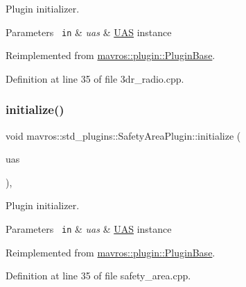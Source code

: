 Plugin initializer. 


\begin{DoxyParams}[1]{Parameters}
\mbox{\texttt{ in}}  & {\em uas} & {\ttfamily \mbox{\hyperlink{classmavros_1_1UAS}{U\+AS}}} instance \\
\hline
\end{DoxyParams}


Reimplemented from \mbox{\hyperlink{group__plugin_gad5313a41da4d26acbbabf008cdc21e82}{mavros\+::plugin\+::\+Plugin\+Base}}.



Definition at line 35 of file 3dr\+\_\+radio.\+cpp.

\mbox{\label{group__plugin_gae1ffa70f4b88baa719fdcc22b7b739b6}} 
\subsubsection{\texorpdfstring{initialize()}{initialize()}\hspace{0.1cm}{\footnotesize\ttfamily [7/41]}}
{\footnotesize\ttfamily void mavros\+::std\+\_\+plugins\+::\+Safety\+Area\+Plugin\+::initialize (\begin{DoxyParamCaption}\item[{\mbox{\hyperlink{classmavros_1_1UAS}{U\+AS}} \&}]{uas }\end{DoxyParamCaption})\hspace{0.3cm}{\ttfamily [inline]}, {\ttfamily [virtual]}}



Plugin initializer. 


\begin{DoxyParams}[1]{Parameters}
\mbox{\texttt{ in}}  & {\em uas} & {\ttfamily \mbox{\hyperlink{classmavros_1_1UAS}{U\+AS}}} instance \\
\hline
\end{DoxyParams}


Reimplemented from \mbox{\hyperlink{group__plugin_gad5313a41da4d26acbbabf008cdc21e82}{mavros\+::plugin\+::\+Plugin\+Base}}.



Definition at line 35 of file safety\+\_\+area.\+cpp.

\mbox{\label{group__plugin_gaa344b18446d091fdcc0d29f71de47b59}} 
